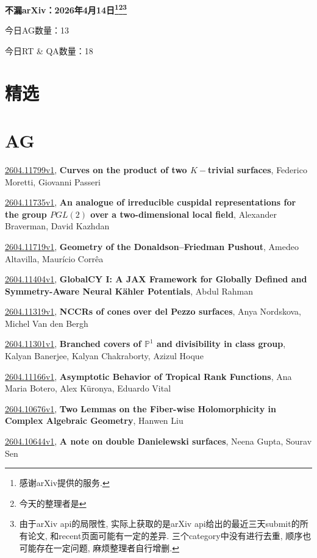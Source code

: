 \documentclass[9pt, a4paper]{article}
\theoremstyle{plain}
\theoremstyle{definition}
\theoremstyle{remark}
\newcommand{\arxiv}[3]{\href{https://arxiv.org/abs/#1}{#1}, \textbf{\textcolor{arxivblue}{#2}}, #3}
\newcommand{\AGnumber}{13}
\newcommand{\RTQAnumber}{18}
\newcommand{\NewestDate}{2026年4月14日}
\newcommand{\todayarXiver}{} %
\begin{document}
\begin{center}
    \Huge\textbf{不漏arXiv：\NewestDate\footnote{感谢arXiv提供的服务.}\footnote{今天的整理者是\todayarXiver}\footnote{由于arXiv api的局限性, 实际上获取的是arXiv api给出的最近三天submit的所有论文, 和recent页面可能有一定的差异. 三个category中没有进行去重, 顺序也可能存在一定问题, 麻烦整理者自行增删.}} \\
\end{center}

\setcounter{section}{-1}

\begin{center}
    今日AG数量：\AGnumber
    
    今日RT \& QA数量：\RTQAnumber
    
\end{center}


\section{精选}


\section{AG}
\arxiv{2604.11799v1}{Curves on the product of two $K-$trivial surfaces}{Federico Moretti, Giovanni Passeri}

\arxiv{2604.11735v1}{An analogue of irreducible cuspidal representations for the group $PGL(2)$ over a two-dimensional local field}{Alexander Braverman, David Kazhdan}

\arxiv{2604.11719v1}{Geometry of the Donaldson--Friedman Pushout}{Amedeo Altavilla, Maurício Corrêa}

\arxiv{2604.11404v1}{GlobalCY I: A JAX Framework for Globally Defined and Symmetry-Aware Neural Kähler Potentials}{Abdul Rahman}

\arxiv{2604.11319v1}{NCCRs of cones over del Pezzo surfaces}{Anya Nordskova, Michel Van den Bergh}

\arxiv{2604.11301v1}{Branched covers of $\mathbb{P}^1$ and divisibility in class group}{Kalyan Banerjee, Kalyan Chakraborty, Azizul Hoque}

\arxiv{2604.11166v1}{Asymptotic Behavior of Tropical Rank Functions}{Ana Maria Botero, Alex Küronya, Eduardo Vital}

\arxiv{2604.10676v1}{Two Lemmas on the Fiber-wise Holomorphicity in Complex Algebraic Geometry}{Hanwen Liu}

\arxiv{2604.10644v1}{A note on double Danielewski surfaces}{Neena Gupta, Sourav Sen}
\end{document}
